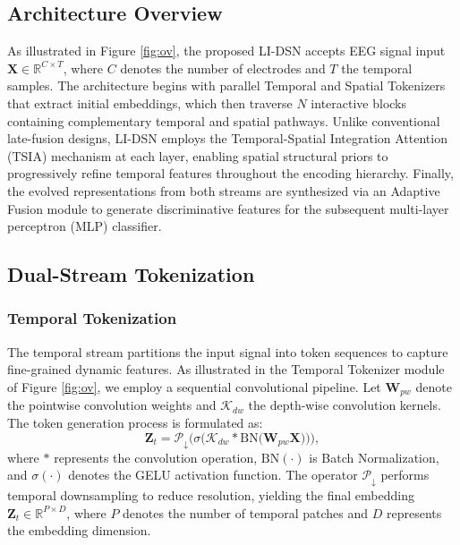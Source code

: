 \documentclass[journal]{IEEEtran}
\theoremstyle{plain}
\begin{document}
\subsection{Architecture Overview}

As illustrated in Figure \ref{fig:ov}, the proposed LI-DSN accepts EEG signal input $\mathbf{X}\in\mathbb{R}^{C\times T}$, where $C$ denotes the number of electrodes and $T$ the temporal samples. The architecture begins with parallel Temporal and Spatial Tokenizers that extract initial embeddings, which then traverse $N$ interactive blocks containing complementary temporal and spatial pathways. Unlike conventional late-fusion designs, LI-DSN employs the Temporal-Spatial Integration Attention (TSIA) mechanism at each layer, enabling spatial structural priors to progressively refine temporal features throughout the encoding hierarchy. Finally, the evolved representations from both streams are synthesized via an Adaptive Fusion module to generate discriminative features for the subsequent multi-layer perceptron (MLP) classifier.

\subsection{Dual-Stream Tokenization}

\subsubsection{Temporal Tokenization}
The temporal stream partitions the input signal into token sequences to capture fine-grained dynamic features. As illustrated in the Temporal Tokenizer module of Figure \ref{fig:ov}, we employ a sequential convolutional pipeline. Let $\mathbf{W}_{pw}$ denote the pointwise convolution weights and $\mathcal{K}_{dw}$ the depth-wise convolution kernels. The token generation process is formulated as:
\begin{equation}
\mathbf{Z}_t = \mathcal{P}_{\downarrow} \Big( \sigma \Big( \mathcal{K}_{dw} \ast \text{BN} \big( \mathbf{W}_{pw} \mathbf{X} \big) \Big) \Big),
\label{eq:temporal_token}
\end{equation}
where $\ast$ represents the convolution operation, $\text{BN}(\cdot)$ is Batch Normalization, and $\sigma(\cdot)$ denotes the GELU activation function. The operator $\mathcal{P}_{\downarrow}$ performs temporal downsampling to reduce resolution, yielding the final embedding $\mathbf{Z}_t\in\mathbb{R}^{P\times D}$, where $P$ denotes the number of temporal patches and $D$ represents the embedding dimension.
\end{document}
